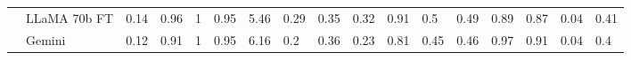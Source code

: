 \begin{table*}[t]
{\begin{tabular}{@{}ll|llll|llll|lll|ll|ll@{}}
                           & LLaMA 70b FT         & 0.14                                                                    & 0.96                                                                     & 1                                                                     & 0.95                                                                  & 5.46                                                                    & 0.29                                                                  & 0.35                                                                  & 0.32                                                                   & 0.91                                                                    & 0.5                                                                   & 0.49                                                                   & 0.89                                                                   & 0.87                                                                   & 0.04                                                                     & 0.41                                                                     \\
                           & Gemini               & 0.12                                                                    & 0.91                                                                     & 1                                                                     & 0.95                                                                  & 6.16                                                                    & 0.2                                                                   & 0.36                                                                  & 0.23                                                                   & 0.81                                                                    & 0.45                                                                  & 0.46                                                                   & 0.97                                                                   & 0.91                                                                   & 0.04                                                                     & 0.4                                                                      \\

\end{tabular}}
\end{table*}
